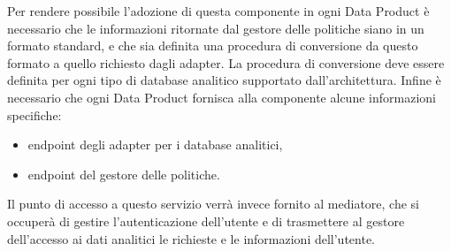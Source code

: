 \documentclass[12pt]{report}
\begin{document}
Per rendere possibile l'adozione di questa componente in ogni Data Product è necessario  che le informazioni ritornate dal gestore delle politiche siano in un formato standard, e che sia definita una procedura di conversione da questo formato a quello richiesto dagli adapter.
La procedura di conversione deve essere definita per ogni tipo di database analitico supportato dall'architettura.
Infine è necessario che ogni Data Product fornisca alla componente alcune informazioni specifiche: 
\begin{itemize}
    \item endpoint degli adapter per i database analitici,
    \item endpoint del gestore delle politiche. 
\end{itemize}
Il punto di accesso a questo servizio verrà invece fornito al mediatore, che si occuperà di gestire l'autenticazione dell'utente e di trasmettere al gestore dell'accesso ai dati analitici le richieste e le informazioni dell'utente.
\end{document}
